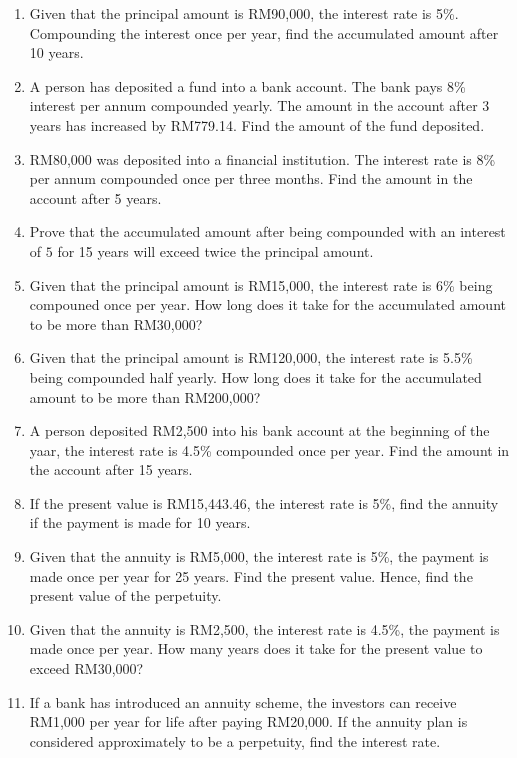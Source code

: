 \documentclass[12pt]{report}
\begin{document}
\setlength{\columnseprule}{1pt}
\setlength{\columnsep}{24pt}
\begin{multicols}{2}
    \begin{enumerate}
        \item Given that the principal amount is RM90,000, the interest rate is 5\%.
              Compounding the interest once per year, find the accumulated amount after 10
              years.
        \item A person has deposited a fund into a bank account. The bank pays 8\% interest
              per annum compounded yearly. The amount in the account after 3 years has
              increased by RM779.14. Find the amount of the fund deposited.

        \item RM80,000 was deposited into a financial institution. The interest rate is 8\%
              per annum compounded once per three months. Find the amount in the account
              after 5 years.
        \item Prove that the accumulated amount after being compounded with an interest of
              $5$ for 15 years will exceed twice the principal amount.
        \item Given that the principal amount is RM15,000, the interest rate is 6\% being
              compouned once per year. How long does it take for the accumulated amount to be
              more than RM30,000?
        \item Given that the principal amount is RM120,000, the interest rate is 5.5\% being
              compounded half yearly. How long does it take for the accumulated amount to be
              more than RM200,000?
        \item A person deposited RM2,500 into his bank account at the beginning of the yaar,
              the interest rate is 4.5\% compounded once per year. Find the amount in the
              account after 15 years.
        \item If the present value is RM15,443.46, the interest rate is 5\%, find the annuity
              if the payment is made for 10 years.
        \item Given that the annuity is RM5,000, the interest rate is 5\%, the payment is
              made once per year for 25 years. Find the present value. Hence, find the
              present value of the perpetuity.
        \item Given that the annuity is RM2,500, the interest rate is 4.5\%, the payment is
              made once per year. How many years does it take for the present value to exceed
              RM30,000?
        \item If a bank has introduced an annuity scheme, the investors can receive RM1,000
              per year for life after paying RM20,000. If the annuity plan is considered
              approximately to be a perpetuity, find the interest rate.
    \end{enumerate}
\end{multicols}
\end{document}
